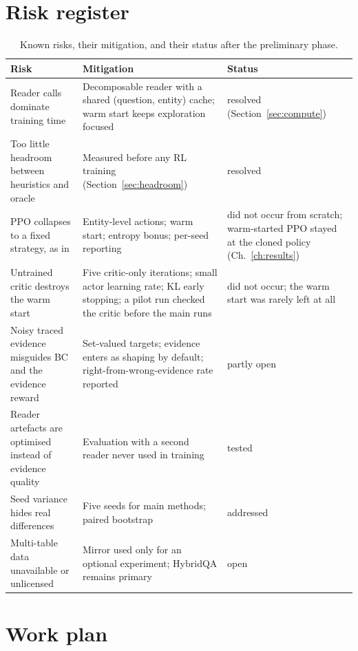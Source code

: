 \section{Risk register}

\begin{table}[ht]
\centering
\footnotesize
\caption{Known risks, their mitigation, and their status after the preliminary phase.}
\label{tab:risks}
\begin{tabularx}{\textwidth}{@{}>{\raggedright\arraybackslash}p{3.6cm}>{\raggedright\arraybackslash}X>{\raggedright\arraybackslash}p{3.3cm}@{}}
\toprule
Risk & Mitigation & Status \\
\midrule
Reader calls dominate training time & Decomposable reader with a shared (question, entity) cache; warm start keeps exploration focused & resolved (Section~\ref{sec:compute}) \\
Too little headroom between heuristics and oracle & Measured before any RL training (Section~\ref{sec:headroom}) & resolved \\
PPO collapses to a fixed strategy, as in \citet{jose2024qatexttablesdrl} & Entity-level actions; warm start; entropy bonus; per-seed reporting & did not occur from scratch; warm-started PPO stayed at the cloned policy (Ch.~\ref{ch:results}) \\
Untrained critic destroys the warm start & Five critic-only iterations; small actor learning rate; KL early stopping; a pilot run checked the critic before the main runs & did not occur; the warm start was rarely left at all \\
Noisy traced evidence misguides BC and the evidence reward & Set-valued targets; evidence enters as shaping by default; right-from-wrong-evidence rate reported & partly open \\
Reader artefacts are optimised instead of evidence quality & Evaluation with a second reader never used in training & tested \\
Seed variance hides real differences & Five seeds for main methods; paired bootstrap & addressed \\
Multi-table data unavailable or unlicensed & Mirror used only for an optional experiment; HybridQA remains primary & open \\
\bottomrule
\end{tabularx}
\end{table}

\section{Work plan}
\label{sec:workplan}

